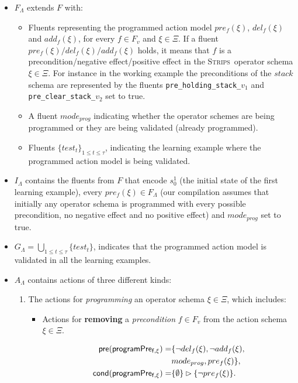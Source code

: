 \documentclass[letterpaper]{article} %
\newcommand{\pre}{\mathsf{pre}}     %
\newcommand{\cond}{\mathsf{cond}}   %
\newcommand{\strips}{\textsc{Strips}}     %
\begin{document}
\begin{itemize}
\item $F_{\Lambda}$ extends $F$ with:
\begin{itemize}
\item Fluents representing the programmed action model $pre_f(\xi)$, $del_f(\xi)$ and $add_f(\xi)$, for every $f\in F_v$ and $\xi \in \Xi$. If a fluent $pre_f(\xi)/del_f(\xi)/add_f(\xi)$ holds, it means that $f$ is a precondition/negative effect/positive effect in the \strips\ operator schema $\xi\in \Xi$. For instance in the working example the preconditions of the $stack$ schema are represented by the fluents {\small\tt pre\_holding\_stack\_$v_1$} and {\small\tt pre\_clear\_stack\_$v_2$} set to true.
\item A fluent $mode_{prog}$ indicating whether the operator schemes are being programmed or they are being validated (already programmed).
\item Fluents $\{test_t\}_{1\leq t\leq \tau}$, indicating the learning example where the programmed action model is being validated.
\end{itemize}
\item $I_{\Lambda}$ contains the fluents from $F$ that encode $s_0^1$ (the initial state of the first learning example), every $pre_f(\xi)\in F_{\Lambda}$ (our compilation assumes that initially any operator schema is programmed with every possible precondition, no negative effect and no positive effect) and $mode_{prog}$ set to true.
\item $G_{\Lambda}=\bigcup_{1\leq t\leq \tau}\{test_t\}$, indicates that the programmed action model is validated in all the learning examples.
\item $A_{\Lambda}$ contains actions of three different kinds:
\begin{enumerate}
\item The actions for {\em programming} an operator schema $\xi\in\Xi$, which includes:
\begin{itemize}
\item Actions for {\bf removing} a {\em precondition} $f\in F_v$ from the action schema $\xi\in\Xi$.

\begin{small}
\begin{align*}
\hspace*{7pt}\pre(\mathsf{programPre_{f,\xi}})=&\{\neg del_{f}(\xi),\neg add_{f}(\xi),\\
& mode_{prog}, pre_{f}(\xi)\},\\
\cond(\mathsf{programPre_{f,\xi}})=&\{\emptyset\}\rhd\{\neg pre_{f}(\xi)\}.
\end{align*}
\end{small}


\end{itemize}
\end{enumerate}
\end{itemize}
\end{document}
